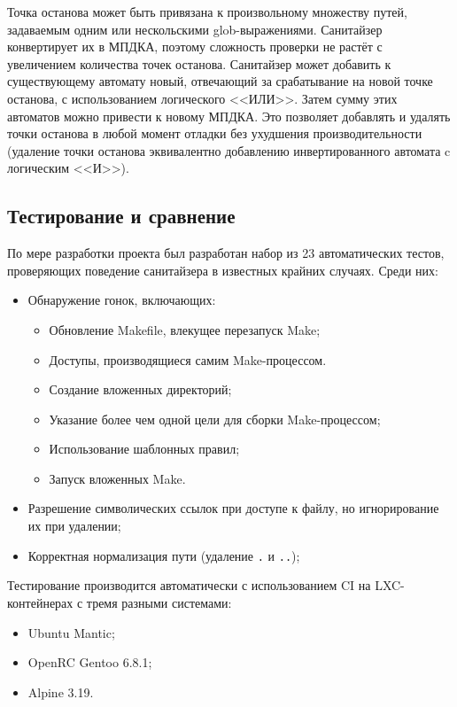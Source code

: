 Точка останова может быть привязана к произвольному множеству путей, задаваемым одним или нескольскими glob-выражениями. Санитайзер конвертирует их в МПДКА, поэтому сложность проверки не растёт с увеличением количества точек останова. Санитайзер может добавить к существующему автомату новый, отвечающий за срабатывание на новой точке останова, с использованием логического <<ИЛИ>>. Затем сумму этих автоматов можно привести к новому МПДКА. Это позволяет добавлять и удалять точки останова в любой момент отладки без ухудшения производительности (удаление точки останова эквивалентно добавлению инвертированного автомата c логическим <<И>>).

\subsection{Тестирование и сравнение}

По мере разработки проекта был разработан набор из 23 автоматических тестов, проверяющих поведение санитайзера в известных крайних случаях. Среди них:

\begin{itemize}
    \item Обнаружение гонок, включающих:
    \begin{itemize}
        \item Обновление Makefile, влекущее перезапуск Make;
        \item Доступы, производящиеся самим Make-процессом.
        \item Создание вложенных директорий;
        \item Указание более чем одной цели для сборки Make-процессом;
        \item Использование шаблонных правил;
        \item Запуск вложенных Make.
    \end{itemize}
    \item Разрешение символических ссылок при доступе к файлу, но игнорирование их при удалении;
    \item Корректная нормализация пути (удаление \texttt{.} и \texttt{..});
\end{itemize}

Тестирование производится автоматически с использованием CI на LXC-контейнерах с тремя разными системами:

\begin{itemize}
    \item Ubuntu Mantic;
    \item OpenRC Gentoo 6.8.1;
    \item Alpine 3.19.
\end{itemize}

